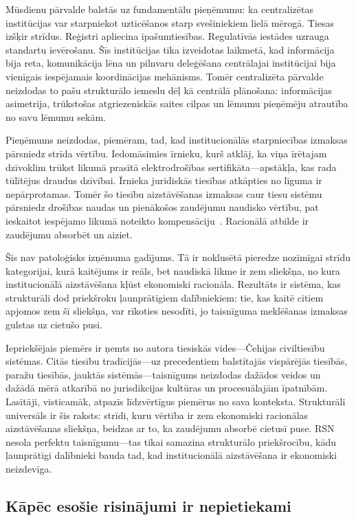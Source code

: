\documentclass[11pt,a4paper,twocolumn]{article}
\begin{document}
Mūsdienu pārvalde balstās uz fundamentālu pieņēmumu: ka centralizētas institūcijas var starpniekot uzticēšanos starp svešiniekiem lielā mērogā. Tiesas izšķir strīdus. Reģistri apliecina īpašumtiesības. Regulatīvās iestādes uzrauga standartu ievērošanu. Šīs institūcijas tika izveidotas laikmetā, kad informācija bija reta, komunikācija lēna un pilnvaru deleģēšana centrālajai institūcijai bija vienīgais iespējamais koordinācijas mehānisms. Tomēr centralizēta pārvalde neizdodas to pašu strukturālo iemeslu dēļ kā centrālā plānošana: informācijas asimetrija, trūkstošas atgriezeniskās saites cilpas un lēmumu pieņēmēju atrautība no savu lēmumu sekām.

Pieņēmums neizdodas, piemēram, tad, kad institucionālās starpniecības izmaksas pārsniedz strīda vērtību. Iedomāsimies īrnieku, kurš atklāj, ka viņa īrētajam dzīvoklim trūkst likumā prasītā elektrodrošības sertifikāta---apstākļa, kas rada tūlītējus draudus dzīvībai. Īrnieka juridiskās tiesības atkāpties no līguma ir nepārprotamas. Tomēr šo tiesību aizstāvēšanas izmaksas caur tiesu sistēmu pārsniedz drošības naudas un pienākošos zaudējumu naudisko vērtību, pat ieskaitot iespējamo likumā noteikto kompensāciju~\cite{czcourtfees}. Racionālā atbilde ir zaudējumu absorbēt un aiziet.

Šis nav patoloģisks izņēmuma gadījums. Tā ir noklusētā pieredze nozīmīgai strīdu kategorijai, kurā kaitējums ir reāls, bet naudiskā likme ir zem sliekšņa, no kura institucionālā aizstāvēšana kļūst ekonomiski racionāla. Rezultāts ir sistēma, kas strukturāli dod priekšroku ļaunprātīgiem dalībniekiem: tie, kas kaitē citiem apjomos zem šī sliekšņa, var rīkoties nesodīti, jo taisnīguma meklēšanas izmaksas gulstas uz cietušo pusi.

Iepriekšējais piemērs ir ņemts no autora tiesiskās vides---Čehijas civiltiesību sistēmas. Citās tiesību tradīcijās---uz precedentiem balstītajās vispārējās tiesībās, paražu tiesībās, jauktās sistēmās---taisnīgums neizdodas dažādos veidos un dažādā mērā atkarībā no jurisdikcijas kultūras un procesuālajām īpatnībām. Lasītāji, visticamāk, atpazīs līdzvērtīgus piemērus no sava konteksta. Strukturāli universāls ir šis raksts: strīdi, kuru vērtība ir zem ekonomiski racionālas aizstāvēšanas sliekšņa, beidzas ar to, ka zaudējumu absorbē cietusī puse. RSN nesola perfektu taisnīgumu---tas tikai samazina strukturālo priekšrocību, kādu ļaunprātīgi dalībnieki bauda tad, kad institucionālā aizstāvēšana ir ekonomiski neizdevīga.

\subsection{Kāpēc esošie risinājumi ir nepietiekami}
\end{document}

